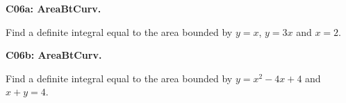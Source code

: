 \documentclass[12pt]{article}
\newcommand{\<}{\left\langle}
\renewcommand{\>}{\right\rangle}
\newcommand{\exerciseHeader}[4]{


  \vspace{0.5em}
  \textbf{#2}
  \vspace{0.5em}

}
\begin{document}
\begin{multicols}{2}
%

%

%

%

%

\exerciseHeader{2017 July 14}{C06a: AreaBtCurv. }{
Express an area between curves as a definite integral.
}{Extra2}

Find a definite integral equal to the area bounded by
\(y=x\), \(y=3x\) and \(x=2\).

\exerciseHeader{2017 July 14}{C06b: AreaBtCurv. }{
Express an area between curves as a definite integral.
}{Extra2}

Find a definite integral equal to the area bounded by
\(y=x^2-4x+4\) and \(x+y=4\).

\columnbreak



%

%

%


\end{multicols}
\end{document}
